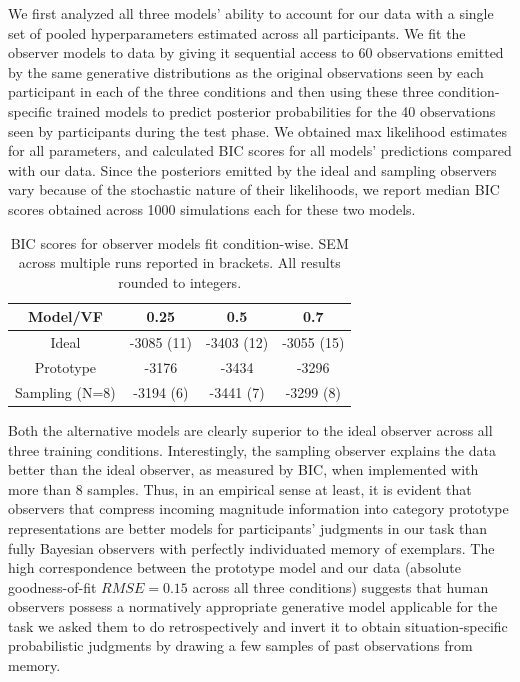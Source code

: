 \documentclass[10pt,letterpaper]{article}
\begin{document}
We first analyzed all three models' ability to account for our data with a single set of pooled hyperparameters estimated across all participants. We fit the observer models to data by giving it sequential access to 60 observations emitted by the same generative distributions as the original observations seen by each participant in each of the three conditions and then using these three condition-specific trained models to predict posterior probabilities for the 40 observations seen by participants during the test phase. We obtained max likelihood estimates for all parameters, and calculated BIC scores for all models' predictions compared with our data. Since the posteriors emitted by the ideal and sampling observers vary because of the stochastic nature of their likelihoods, we report median BIC scores obtained across 1000 simulations each for these two models. 

\begin{table}[]
    \centering
    \begin{tabular}{|c|c|c|c|}
    \hline
         Model/VF & 0.25 & 0.5 & 0.7 \\
         \hline
         Ideal & -3085 (11) & -3403 (12) & -3055 (15) \\
         Prototype & -3176 & -3434 & -3296 \\
         Sampling (N=8) & -3194 (6) & -3441 (7) & -3299 (8) \\
         \hline 
    \end{tabular}
    \caption{BIC scores for observer models fit condition-wise. SEM across multiple runs reported in brackets. All results rounded to integers.}
    \label{tab:bic}
\end{table}

Both the alternative models are clearly superior to the ideal observer across all three training conditions. Interestingly, the sampling observer explains the data better than the ideal observer, as measured by BIC, when implemented with more than 8 samples. Thus, in an empirical sense at least, it is evident that observers that compress incoming magnitude information into category prototype representations are better models for participants' judgments in our task than fully Bayesian observers with perfectly individuated memory of exemplars. The high correspondence between the prototype model and our data (absolute goodness-of-fit $RMSE=0.15$ across all three conditions) suggests that human observers possess a normatively appropriate generative model applicable for the task we asked them to do retrospectively and invert it to obtain situation-specific probabilistic judgments by drawing a few samples of past observations from memory.  
\end{document}
